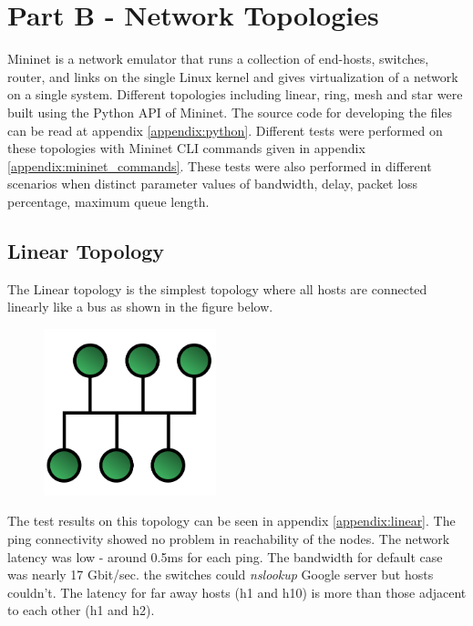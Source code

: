 \documentclass[a4paper, 11pt]{article}
\begin{document}
\newpage

\section{Part B - Network Topologies}

Mininet is a network emulator that runs a collection of end-hosts, switches, router, and links on
the single Linux kernel and gives virtualization of a network on a single system. Different topologies including linear, ring, mesh and star were built using the Python API of Mininet. The source code for developing the files can be read at appendix \ref{appendix:python}. Different tests were performed on these topologies with Mininet CLI commands given in appendix \ref{appendix:mininet_commands}. These tests were also performed in different scenarios when distinct parameter values of bandwidth, delay, packet loss percentage, maximum queue length. 

\subsection{Linear Topology}

The Linear topology is the simplest topology where all hosts are connected linearly like a bus as shown in the figure below.

\begin{figure}[h]
\centering %
\includegraphics[width=5cm]{linear}
\end{figure}

The test results on this topology can be seen in appendix \ref{appendix:linear}. The ping connectivity showed no problem in reachability of the nodes. The network latency was low - around 0.5ms for each ping. The bandwidth for default case was nearly 17 Gbit/sec. the switches could \textit{nslookup} Google server but hosts couldn't. The latency for far away hosts (h1 and h10) is more than those adjacent to each other (h1 and h2).
\end{document}
